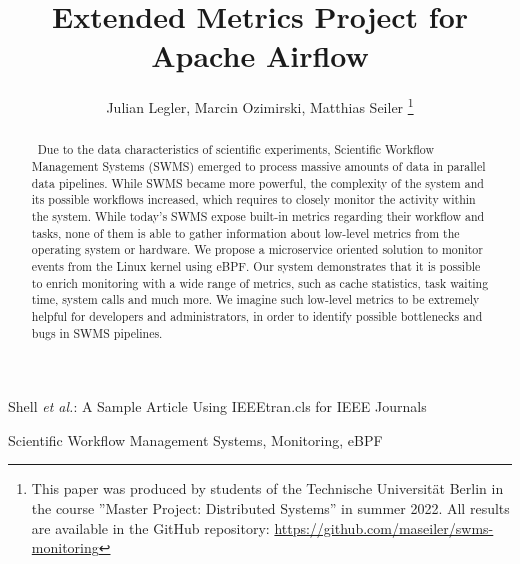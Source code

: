 \documentclass[a4paper,journal]{IEEEtran}
\begin{document}
	
	\title{Extended Metrics Project for Apache Airflow}%
	
	
	
	\author{Julian Legler, Marcin Ozimirski, Matthias Seiler
		\thanks{This paper was produced by students of the Technische Universität Berlin in the course ''Master Project: Distributed Systems'' in summer 2022. All results are available in the GitHub repository: \url{https://github.com/maseiler/swms-monitoring}}%
	}
	
	{Shell \MakeLowercase{\textit{et al.}}: A Sample Article Using IEEEtran.cls for IEEE Journals}
	
	
	\maketitle
	
	\begin{abstract}
		~Due to the data characteristics of scientific experiments, Scientific Workflow Management Systems (SWMS) emerged to process massive amounts of data in parallel data pipelines. While SWMS became more powerful, the complexity of the system and its possible workflows increased, which requires to closely monitor the activity within the system.
		While today's SWMS expose built-in metrics regarding their workflow and tasks, none of them is able to gather information about low-level metrics from the operating system or hardware. 
		We propose a microservice oriented solution to monitor events from the Linux kernel using eBPF. 
		Our system demonstrates that it is possible to enrich monitoring with a wide range of metrics, such as cache statistics, task waiting time, system calls and much more.
		We imagine such low-level metrics to be extremely helpful for developers and administrators, in order to identify possible bottlenecks and bugs in SWMS pipelines. 		
	\end{abstract}
	
	\begin{IEEEkeywords}
		Scientific Workflow Management Systems, Monitoring, eBPF
	\end{IEEEkeywords}
	
\end{document}
